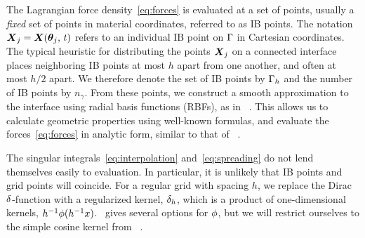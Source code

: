 The Lagrangian force density~\eqref{eq:forces} is evaluated at a set of points, usually a
\emph{fixed} set of points in material coordinates, referred to as IB points. The
notation $\boldsymbol{X}_j=\boldsymbol{X}(\boldsymbol{\theta}_j,\,t)$ refers to an individual IB point on $\Gamma$ in
Cartesian coordinates. The typical heuristic for distributing the points $\boldsymbol{X}_j$ on a
connected interface places neighboring IB points at most $h$ apart from one another, and
often at most $h/2$ apart. We therefore denote the set of IB points by $\Gamma_h$ and
the number of IB points by $n_\gamma$. From these points, we construct a smooth
approximation to the interface using radial basis functions (RBFs), as in~%
\cite{Shankar:2015km}. This allows us to calculate geometric properties using well-known
formulas, and evaluate the forces~\eqref{eq:forces} in analytic form, similar to that of%
~\cite{Maxian:2018ek}.

The singular integrals~\eqref{eq:interpolation} and~\eqref{eq:spreading} do not lend
themselves easily to evaluation. In particular, it is unlikely that IB points and grid
points will coincide. For a regular grid with spacing $h$, we replace the Dirac
$\delta$-function with a regularized kernel, $\delta_h$, which is a product of
one-dimensional kernels, $h^{-1}\phi(h^{-1}x)$.~\cite{Griffith:2020hi} gives several
options for $\phi$, but we will restrict ourselves to the simple cosine kernel from~%
\cite{Peskin:2002go}.

